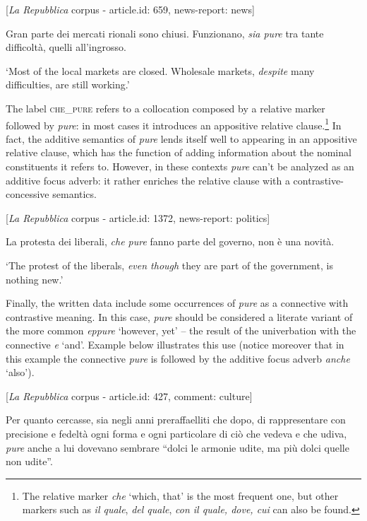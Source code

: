 \newpage
\ea%
    \label{ex:key:42}

          [\textit{La Repubblica} corpus - article.id: 659, news-report: news]

Gran parte dei mercati rionali sono chiusi. Funzionano, \textit{sia pure} tra tante difficoltà, quelli all’ingrosso.

\glt ‘Most of the local markets are closed. Wholesale markets, \textit{despite} many difficulties, are still working.’
    \z

The label \textsc{che\_pure} refers to a collocation composed by a relative marker followed by \textit{pure}: in most cases it introduces an appositive relative clause.\footnote{The relative marker \textit{che} ‘which, that’ is the most frequent one, but other markers such as \textit{il quale}, \textit{del quale}, \textit{con il quale, dove, cui} can also be found.} In fact, the additive semantics of \textit{pure} lends itself well to appearing in an appositive relative clause, which has the function of adding information about the nominal constituents it refers to. However, in these contexts \textit{pure} can’t be analyzed as an additive focus adverb: it rather enriches the relative clause with a contrastive-concessive semantics.

\ea%
    \label{ex:key:43}

           [\textit{La Repubblica} corpus - article.id: 1372, news-report: politics]

La protesta dei liberali, \textit{che pure} fanno parte del governo, non è una novità.

\glt ‘The protest of the liberals, \textit{even though} they are part of the government, is nothing new.’
    \z

Finally, the written data include some occurrences of \textit{pure} as a connective with contrastive meaning. In this case, \textit{pure} should be considered a literate variant of the more common \textit{eppure} ‘however, yet’ – the result of the univerbation with the connective \textit{e} ‘and’. Example  below illustrates this use (notice moreover that in this example the connective \textit{pure} is followed by the additive focus adverb \textit{anche} ‘also’).


\largerpage[2]%
\ea%
    \label{ex:key:44}

           [\textit{La Repubblica} corpus - article.id: 427, comment: culture]

Per quanto cercasse, sia negli anni preraffaelliti che dopo, di rappresentare con precisione e fedeltà ogni forma e ogni particolare di ciò che vedeva e che udiva, \textit{pure} anche a lui dovevano sembrare “dolci le armonie udite, ma più dolci quelle non udite”.

